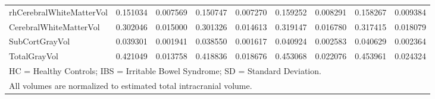 \begin{table}[H]
\begin{tabular}{lcccccccc}
rhCerebralWhiteMatterVol & 0.151034 & 0.007569 & 0.150747 & 0.007270 & 0.159252 & 0.008291 & 0.158267 & 0.009384 \\
CerebralWhiteMatterVol & 0.302046 & 0.015000 & 0.301326 & 0.014613 & 0.319147 & 0.016780 & 0.317415 & 0.018079 \\
SubCortGrayVol & 0.039301 & 0.001941 & 0.038550 & 0.001617 & 0.040924 & 0.002583 & 0.040629 & 0.002364 \\
TotalGrayVol & 0.421049 & 0.013758 & 0.418836 & 0.018676 & 0.453068 & 0.022076 & 0.453961 & 0.024324 \\
\hline
\multicolumn{9}{l}{\footnotesize HC = Healthy Controls; IBS = Irritable Bowel Syndrome; SD = Standard Deviation.} \\
\multicolumn{9}{l}{\footnotesize All volumes are normalized to estimated total intracranial volume.} \\
\end{tabular}
\label{tab:volume_comparison}
\end{table}